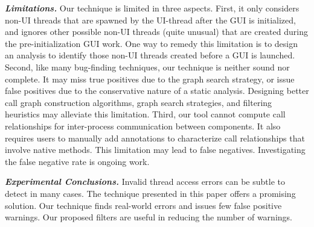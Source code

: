 \vspace{1mm}

\noindent \textbf{\textit{Limitations.}}
Our technique is limited in three aspects. First, it only considers
non-UI threads that are spawned by the UI-thread after the GUI
is initialized, and ignores other possible non-UI threads (quite unusual)
that are created during the pre-initialization GUI work. One way
to remedy this limitation is to design an analysis to identify
those non-UI threads created before a GUI is launched.
Second, like many bug-finding techniques, our technique
is neither sound nor complete. It may miss true positives due
to the graph search strategy, or
issue false positives due to the conservative nature of
a static analysis. Designing better call graph construction algorithms,
graph search strategies, and filtering heuristics may alleviate this limitation.
Third, our tool cannot compute call relationships
for inter-process communication between components. It also
requires users to manually add annotations to characterize
call relationships that involve native methods. This limitation
may lead to false negatives. Investigating the false negative
rate is ongoing work.


\vspace{1mm}

\noindent \textbf{\textit{Experimental Conclusions.}}
Invalid thread access errors  can be subtle to detect in many cases.
The technique presented in this paper offers a promising solution.
Our technique finds real-world errors and issues
few false positive warnings. Our
proposed filters are useful in reducing the number of warnings.



